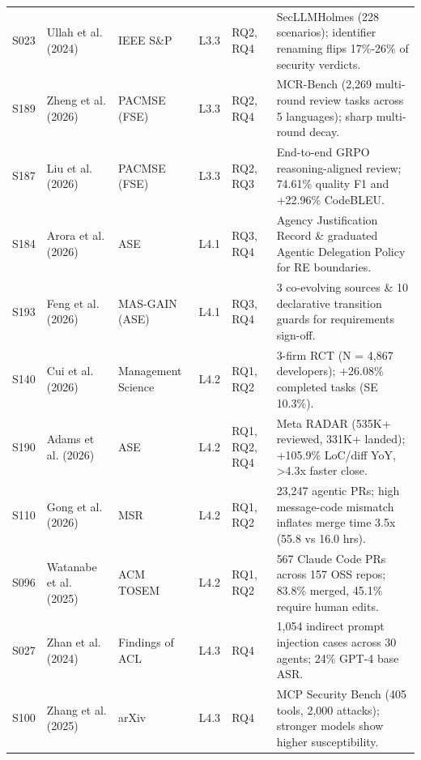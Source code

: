\documentclass[10pt,twocolumn,a4paper]{article}
\begin{document}
\begin{table}[t!]
\begin{tabularx}{\textwidth}{l >{\raggedright\arraybackslash}p{2.65cm} >{\raggedright\arraybackslash}p{2.05cm} c >{\raggedright\arraybackslash}p{1.40cm} X}
S023 & Ullah et al. (2024)~\cite{ullah2024llms} & IEEE S\&P & L3.3 & RQ2, RQ4 & SecLLMHolmes (228 scenarios); identifier renaming flips 17\%-26\% of security verdicts. \\
S189 & Zheng et al. (2026)~\cite{zheng2026static} & PACMSE (FSE) & L3.3 & RQ2, RQ4 & MCR-Bench (2,269 multi-round review tasks across 5 languages); sharp multi-round decay. \\
S187 & Liu et al. (2026)~\cite{liu2026e4rreviewer} & PACMSE (FSE) & L3.3 & RQ2, RQ3 & End-to-end GRPO reasoning-aligned review; 74.61\% quality F1 and +22.96\% CodeBLEU. \\
S184 & Arora et al. (2026)~\cite{arora2026specifying} & ASE & L4.1 & RQ3, RQ4 & Agency Justification Record \& graduated Agentic Delegation Policy for RE boundaries. \\
S193 & Feng et al. (2026)~\cite{feng2026sage} & MAS-GAIN (ASE) & L4.1 & RQ3, RQ4 & 3 co-evolving sources \& 10 declarative transition guards for requirements sign-off. \\
S140 & Cui et al. (2026)~\cite{cui2026effects} & Management Science & L4.2 & RQ1, RQ2 & 3-firm RCT (N = 4,867 developers); +26.08\% completed tasks (SE 10.3\%). \\
S190 & Adams et al. (2026)~\cite{adams2026automating} & ASE & L4.2 & RQ1, RQ2, RQ4 & Meta RADAR (535K+ reviewed, 331K+ landed); +105.9\% LoC/diff YoY, >4.3x faster close. \\
S110 & Gong et al. (2026)~\cite{gong2026analyzing} & MSR & L4.2 & RQ1, RQ2 & 23,247 agentic PRs; high message-code mismatch inflates merge time 3.5x (55.8 vs 16.0 hrs). \\
S096 & Watanabe et al. (2025)~\cite{watanabe2025use} & ACM TOSEM & L4.2 & RQ1, RQ2 & 567 Claude Code PRs across 157 OSS repos; 83.8\% merged, 45.1\% require human edits. \\
S027 & Zhan et al. (2024)~\cite{zhan2024injecagent} & Findings of ACL & L4.3 & RQ4 & 1,054 indirect prompt injection cases across 30 agents; 24\% GPT-4 base ASR. \\
S100 & Zhang et al. (2025)~\cite{zhang2025mcp} & arXiv & L4.3 & RQ4 & MCP Security Bench (405 tools, 2,000 attacks); stronger models show higher susceptibility. \\
\bottomrule
\end{tabularx}
\end{table}
\end{document}
